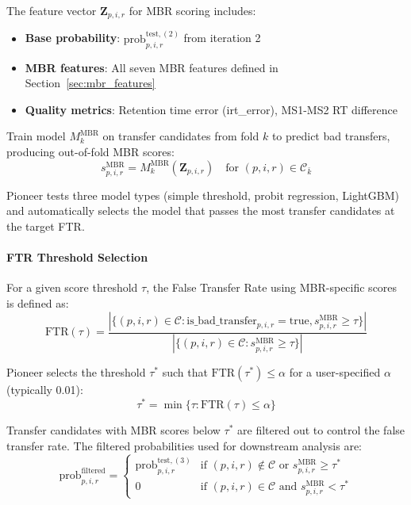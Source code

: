 \documentclass[pdflatex,sn-nature]{sn-jnl}
\begin{document}
The feature vector $\mathbf{Z}_{p,i,r}$ for MBR scoring includes:
\begin{itemize}
  \item \textbf{Base probability}: $\text{prob}_{p,i,r}^{\text{test},(2)}$ from iteration 2
  \item \textbf{MBR features}: All seven MBR features defined in Section~\ref{sec:mbr_features}
  \item \textbf{Quality metrics}: Retention time error (irt\_error), MS1-MS2 RT difference
\end{itemize}

Train model $M_k^{\text{MBR}}$ on transfer candidates from fold $k$ to predict bad transfers, producing out-of-fold MBR scores:
\begin{equation}
  s_{p,i,r}^{\text{MBR}} = M_k^{\text{MBR}}(\mathbf{Z}_{p,i,r}) \quad \text{for } (p,i,r) \in \mathcal{C}_{\bar{k}}
\end{equation}

Pioneer tests three model types (simple threshold, probit regression, LightGBM) and automatically selects the model that passes the most transfer candidates at the target FTR.

\paragraph{FTR Threshold Selection} For a given score threshold $\tau$, the False Transfer Rate using MBR-specific scores is defined as:
\begin{equation}
  \text{FTR}(\tau) = \frac{|\{(p,i,r) \in \mathcal{C} : \text{is\_bad\_transfer}_{p,i,r} = \text{true}, s_{p,i,r}^{\text{MBR}} \geq \tau\}|}{|\{(p,i,r) \in \mathcal{C} : s_{p,i,r}^{\text{MBR}} \geq \tau\}|}
\end{equation}

Pioneer selects the threshold $\tau^*$ such that $\text{FTR}(\tau^*) \leq \alpha$ for a user-specified $\alpha$ (typically 0.01):
\begin{equation}
  \tau^* = \min\{\tau : \text{FTR}(\tau) \leq \alpha\}
\end{equation}

Transfer candidates with MBR scores below $\tau^*$ are filtered out to control the false transfer rate. The filtered probabilities used for downstream analysis are:
\begin{equation}
  \text{prob}_{p,i,r}^{\text{filtered}} = \begin{cases}
      \text{prob}_{p,i,r}^{\text{test},(3)} & \text{if } (p,i,r) \notin \mathcal{C} \text{ or } s_{p,i,r}^{\text{MBR}} \geq \tau^* \\
      0 & \text{if } (p,i,r) \in \mathcal{C} \text{ and } s_{p,i,r}^{\text{MBR}} < \tau^*
    \end{cases}
\end{equation}
\end{document}
